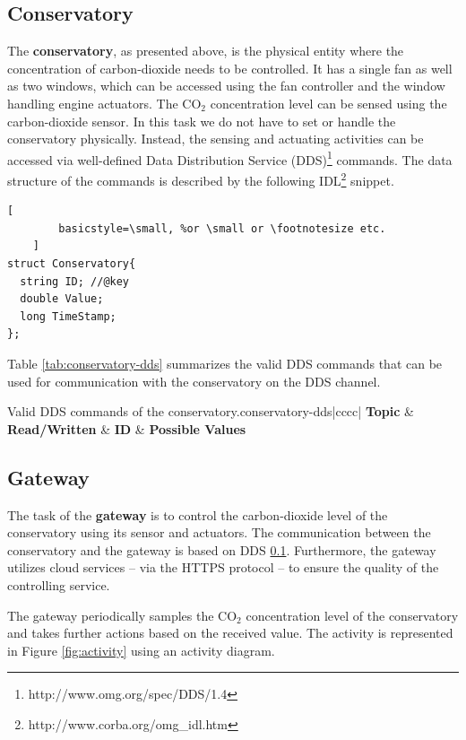 \documentclass[a4paper, 11pt]{article}
\begin{document}
	\subsection{Conservatory}
	\label{sec:conservatory}
	The \textbf{conservatory}, as presented above, is the physical entity where the concentration of carbon-dioxide needs to be controlled. It has a single fan as well as two windows, which can be accessed using the fan controller and the window handling engine actuators. The CO$_2$ concentration level can be sensed using the carbon-dioxide sensor. In this task we do not have to set or handle the conservatory physically. Instead, the sensing and actuating activities can be accessed via well-defined Data Distribution Service (DDS)\footnote{http://www.omg.org/spec/DDS/1.4} commands. The data structure of the commands is described by the following IDL\footnote{http://www.corba.org/omg\_idl.htm} snippet.
	\begin{lstlisting}[
		basicstyle=\small, %or \small or \footnotesize etc.
	]
struct Conservatory{
  string ID; //@key
  double Value;
  long TimeStamp;
};
	\end{lstlisting}
	
	Table \ref{tab:conservatory-dds} summarizes the valid DDS commands that can be used for communication with the conservatory on the DDS channel.
	
	\begin{mytable}{Valid DDS commands of the conservatory.}{conservatory-dds}{|cccc|}
		\hline
		\textbf{Topic} & \textbf{Read/Written} & \textbf{ID} & \textbf{Possible Values} \\ \hline \hline
	\end{mytable}
	
	\subsection{Gateway}
	
	The task of the \textbf{gateway} is to control the carbon-dioxide level of the conservatory using its sensor and actuators. The communication between the conservatory and the gateway is based on DDS \ref{sec:conservatory}. Furthermore, the gateway utilizes cloud services -- via the HTTPS protocol -- to ensure the quality of the controlling service.
	
	The gateway periodically samples the CO$_2$ concentration level of the conservatory and takes further actions based on the received value. The activity is represented in Figure \ref{fig:activity} using an activity diagram.
		
\end{document}
